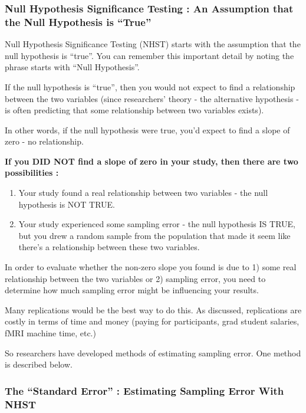\documentclass[
  letterpaper,
  DIV=11,
  numbers=noendperiod,
  oneside]{scrreprt}
\begin{document}
\subsubsection{\texorpdfstring{\textbf{Null Hypothesis Significance
Testing : An Assumption that the Null Hypothesis is
``True''}}{Null Hypothesis Significance Testing : An Assumption that the Null Hypothesis is ``True''}}\label{null-hypothesis-significance-testing-an-assumption-that-the-null-hypothesis-is-true}

Null Hypothesis Significance Testing (NHST) starts with the assumption
that the null hypothesis is ``true''. You can remember this important
detail by noting the phrase starts with ``Null Hypothesis''.

If the null hypothesis is ``true'', then you would not expect to find a
relationship between the two variables (since researchers' theory - the
alternative hypothesis - is often predicting that some relationship
between two variables exists).~

In other words, if the null hypothesis were true, you'd expect to find a
slope of zero - no relationship.

\textbf{If you DID NOT find a slope of zero in your study, then there
are two possibilities :}

\begin{enumerate}
\def\labelenumi{\arabic{enumi}.}
\item
  Your study found a real relationship between two variables - the null
  hypothesis is NOT TRUE.
\item
  Your study experienced some sampling error - the null hypothesis IS
  TRUE, but you drew a random sample from the population that made it
  seem like there's a relationship between these two variables.~
\end{enumerate}

In order to evaluate whether the non-zero slope you found is due to 1)
some real relationship between the two variables or 2) sampling error,
you need to determine how much sampling error might be influencing your
results.~

Many replications would be the best way to do this. As discussed,
replications are costly in terms of time and money (paying for
participants, grad student salaries, fMRI machine time, etc.)

So researchers have developed methods of estimating sampling error. One
method is described below.

\subsubsection{\texorpdfstring{\textbf{The ``Standard Error'' :
Estimating Sampling Error With
NHST}}{The ``Standard Error'' : Estimating Sampling Error With NHST}}\label{the-standard-error-estimating-sampling-error-with-nhst}
\end{document}

